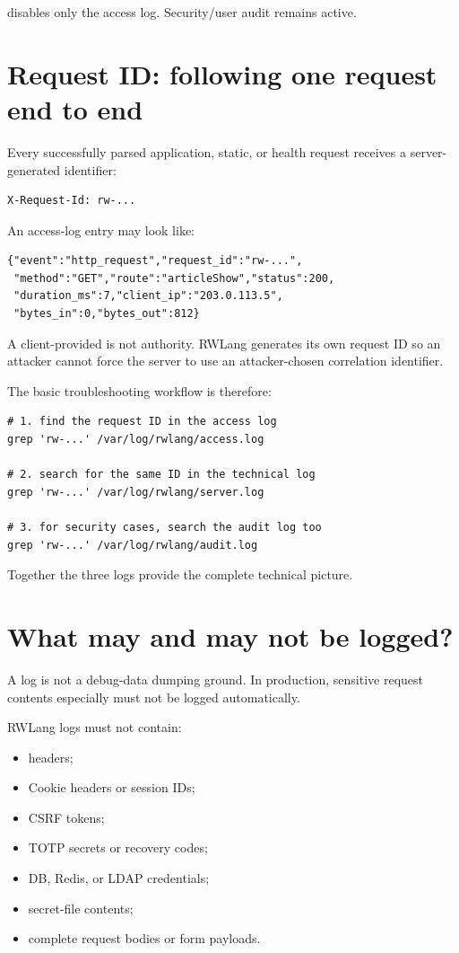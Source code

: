  disables only the access log. Security/user audit remains active.

\section{Request ID: following one request end to end}

Every successfully parsed application, static, or health request receives a server-generated identifier:

\begin{lstlisting}
X-Request-Id: rw-...
\end{lstlisting}

An access-log entry may look like:

\begin{lstlisting}
{"event":"http_request","request_id":"rw-...",
 "method":"GET","route":"articleShow","status":200,
 "duration_ms":7,"client_ip":"203.0.113.5",
 "bytes_in":0,"bytes_out":812}
\end{lstlisting}

A client-provided  is not authority. RWLang generates its own request ID so an attacker cannot force the server to use an attacker-chosen correlation identifier.

The basic troubleshooting workflow is therefore:

\begin{lstlisting}
# 1. find the request ID in the access log
grep 'rw-...' /var/log/rwlang/access.log

# 2. search for the same ID in the technical log
grep 'rw-...' /var/log/rwlang/server.log

# 3. for security cases, search the audit log too
grep 'rw-...' /var/log/rwlang/audit.log
\end{lstlisting}

Together the three logs provide the complete technical picture.

\section{What may and may not be logged?}

A log is not a debug-data dumping ground. In production, sensitive request contents especially must not be logged automatically.

RWLang logs must not contain:

\begin{itemize}
  \item {} headers;
  \item Cookie headers or session IDs;
  \item CSRF tokens;
  \item TOTP secrets or recovery codes;
  \item DB, Redis, or LDAP credentials;
  \item secret-file contents;
  \item complete request bodies or form payloads.
\end{itemize}

